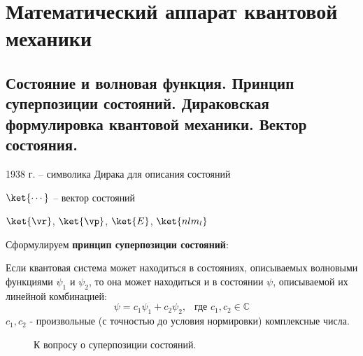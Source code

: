 \chapter{Математический аппарат квантовой механики}

\begin{sloppypar}
  \section{Состояние и волновая функция. Принцип суперпозиции состояний. Дираковская формулировка квантовой механики. Вектор состояния.}
\end{sloppypar}

1938 г. -- символика Дирака для описания состояний

$\ket{\cdots}$ -- вектор состояний

$\ket{\vr}$, $\ket{\vp}$, $\ket{E}$, $\ket{nlm_l}$

Сформулируем \textbf{принцип суперпозиции состояний}:
\begin{stmt}
Если квантовая система может находиться в состояниях, описываемых волновыми функциями $\psi_1$ и $\psi_2$, то она может находиться и в состоянии $\psi$, описываемой их линейной комбинацией:
$$
\psi = c_1 \psi_1 + c_2 \psi_2, ~~ \text{~где~} c_1, c_2 \in \mathbb{C}
$$
$c_1, c_2$ - произвольные (с точностью до условия нормировки) комплексные числа.
\end{stmt}

\begin{figure}[h!]
\centering
{}
\caption{К вопросу о суперпозиции состояний.} \label{fig:3_1}
\end{figure}

